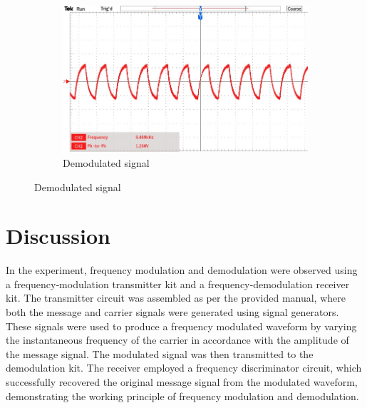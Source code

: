 \documentclass[a4paper,12pt]{article}
\begin{document}
\begin{figure}
	\centering
\begin{subfigure}[t]{0.7\textwidth}
	\centering
	\includegraphics[width=1\linewidth]{Images/8}
	\caption{ Demodulated signal }
\end{subfigure}
\end{figure}
	\newpage

\section{Discussion}
In the experiment, frequency modulation and demodulation were observed using a frequency‐modulation transmitter kit and a frequency‐demodulation receiver kit. The transmitter circuit was assembled as per the provided manual, where both the message and carrier signals were generated using signal generators. These signals were used to produce a frequency modulated waveform by varying the instantaneous frequency of the carrier in accordance with the amplitude of the message signal. The modulated signal was then transmitted to the demodulation kit. The receiver employed a frequency discriminator circuit, which successfully recovered the original message signal from the modulated waveform, demonstrating the working principle of frequency modulation and demodulation.

	
	\newpage
	
	
\end{document}
